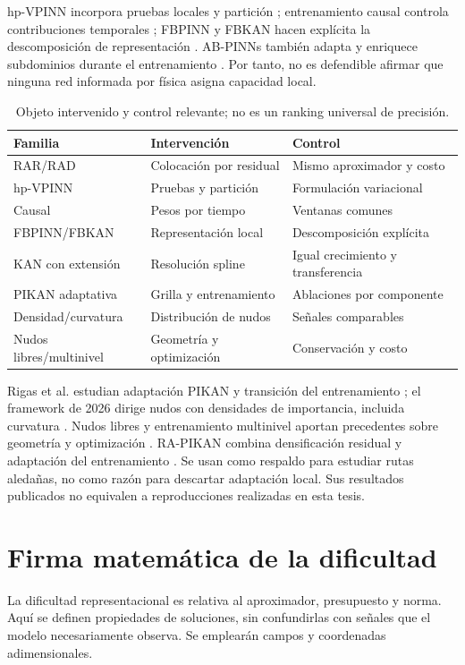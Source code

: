 hp-VPINN incorpora pruebas locales y partición \cite{kharazmi2021hpvpinns}; entrenamiento causal controla contribuciones temporales \cite{wang2024causal}; FBPINN y FBKAN hacen explícita la descomposición de representación \cite{moseley2023,howard2024}. AB-PINNs también adapta y enriquece subdominios durante el entrenamiento \cite{abpinn2025}. Por tanto, no es defendible afirmar que ninguna red informada por física asigna capacidad local.
\begin{table}[htbp]\centering\small\caption{Objeto intervenido y control relevante; no es un ranking universal de precisión.}\label{tab:rejilla}
\begin{tabularx}{\linewidth}{p{.27\linewidth}XX}\toprule
Familia & Intervención & Control\\\midrule
RAR/RAD & Colocación por residual & Mismo aproximador y costo\\
hp-VPINN & Pruebas y partición & Formulación variacional\\
Causal & Pesos por tiempo & Ventanas comunes\\
FBPINN/FBKAN & Representación local & Descomposición explícita\\
KAN con extensión & Resolución spline & Igual crecimiento y transferencia\\
PIKAN adaptativa & Grilla y entrenamiento & Ablaciones por componente\\
Densidad/curvatura & Distribución de nudos & Señales comparables\\
Nudos libres/multinivel & Geometría y optimización & Conservación y costo\\\bottomrule
\end{tabularx}\end{table}
Rigas et al. estudian adaptación PIKAN y transición del entrenamiento \cite{rigas2024}; el framework de 2026 dirige nudos con densidades de importancia, incluida curvatura \cite{rigas2026}. Nudos libres y entrenamiento multinivel aportan precedentes sobre geometría y optimización \cite{actor2025,actor2026}. RA-PIKAN combina densificación residual y adaptación del entrenamiento \cite{leong2026}. Se usan como respaldo para estudiar rutas aledañas, no como razón para descartar adaptación local. Sus resultados publicados no equivalen a reproducciones realizadas en esta tesis.

\section{Firma matemática de la dificultad}
La dificultad representacional es relativa al aproximador, presupuesto y norma. Aquí se definen propiedades de soluciones, sin confundirlas con señales que el modelo necesariamente observa. Se emplearán campos y coordenadas adimensionales.
